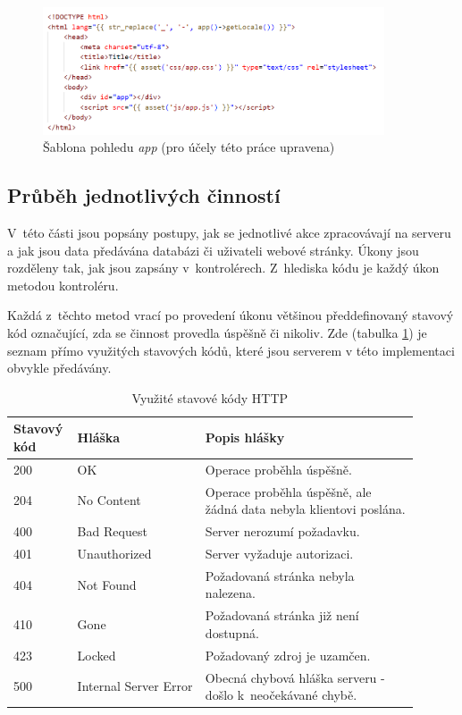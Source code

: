 	\begin{figure}[h]
		\centering
		\includegraphics[width=0.9\textwidth]{img/pohled_app.png}
		\caption{Šablona pohledu \textit{app} (pro účely této práce upravena)}
		\label{fig:pohled_app}
	\end{figure}
	
	\subsection{Průběh jednotlivých činností}\label{sec:be_prubeh_jednotl_cinnosti}
	V~této části jsou popsány postupy, jak se jednotlivé akce zpracovávají na serveru a jak jsou data předávána databázi či uživateli webové stránky. Úkony jsou rozděleny tak, jak jsou zapsány v~kontrolérech. Z~hlediska kódu je každý úkon metodou kontroléru.
	
	Každá z~těchto metod vrací po provedení úkonu většinou předdefinovaný stavový kód označující, zda se činnost provedla úspěšně či nikoliv. Zde (tabulka \ref{tab:http_stavove_kody}) je seznam přímo využitých stavových kódů, které jsou serverem v této implementaci obvykle předávány.
	
	\begin{table}[H]
		\centering
		\begin{tabular}{ | p{0.1\linewidth} | p{0.3\linewidth} |  p{0.5\linewidth} |} 
			\hline
			\textbf{Stavový kód} & \textbf{Hláška} & \textbf{Popis hlášky} \\ 
			\hline
			200 & OK & Operace proběhla úspěšně. \\
			\hline
			204 & No Content & Operace proběhla úspěšně, ale žádná data nebyla klientovi poslána. \\
			\hline
			400 & Bad Request & Server nerozumí požadavku. \\
			\hline
			401 & Unauthorized & Server vyžaduje autorizaci. \\
			\hline
			404 & Not Found & Požadovaná stránka nebyla nalezena. \\
			\hline
			410 & Gone & Požadovaná stránka již není dostupná. \\
			\hline
			423 & Locked & Požadovaný zdroj je uzamčen. \\
			\hline
			500 & Internal Server Error & Obecná chybová hláška serveru - došlo k~neočekávané chybě. \\
			\hline
		\end{tabular}
		\caption{Využité stavové kódy HTTP \cite{HTTPKody1}\cite{HTTPKody2}}
		\label{tab:http_stavove_kody}
	\end{table}

